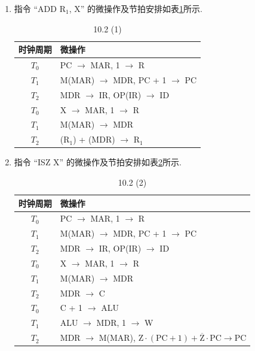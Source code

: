 \documentclass[UTF8]{report}
\newenvironment{solution}{{\noindent\hskip 2em \bf 解 \quad}}{}
\begin{document}
\begin{solution}
    \begin{enumerate}[label=(\arabic*)]
        \item 指令 ``ADD $\mathrm{R_1}$, X'' 的微操作及节拍安排如表\ref{tab:10_2_1}所示.
        \begin{table}[htbp]
            \centering
            \caption{10.2 (1)}
            \begin{tabular}{cl}
                \toprule
                时钟周期 & 微操作 \bigstrut\\
                \midrule
                $T_0$ & PC $\to$ MAR, 1 $\to$ R \bigstrut\\
                $T_1$ & M(MAR) $\to$ MDR, PC + 1 $\to$ PC \bigstrut\\
                $T_2$ & MDR $\to$ IR, OP(IR) $\to$ ID \bigstrut\\
                \midrule
                $T_0$ & X $\to$ MAR, 1 $\to$ R \bigstrut\\
                $T_1$ & M(MAR) $\to$ MDR \bigstrut\\
                $T_2$ & ($\mathrm{R_1}$) + (MDR) $\to$ $\mathrm{R_1}$ \bigstrut\\
                \bottomrule
            \end{tabular}
            \label{tab:10_2_1}%
        \end{table}

        \item 指令 ``ISZ X'' 的微操作及节拍安排如表\ref{tab:10_2_2}所示.
        \begin{table}[htbp]
            \centering
            \caption{10.2 (2)}
            \begin{tabular}{cl}
                \toprule
                时钟周期 & 微操作 \bigstrut\\
                \midrule
                $T_0$ & PC $\to$ MAR, 1 $\to$ R \bigstrut\\
                $T_1$ & M(MAR) $\to$ MDR, PC + 1 $\to$ PC \bigstrut\\
                $T_2$ & MDR $\to$ IR, OP(IR) $\to$ ID \bigstrut\\
                \midrule
                $T_0$ & X $\to$ MAR, 1 $\to$ R \bigstrut\\
                $T_1$ & M(MAR) $\to$ MDR \bigstrut\\
                $T_2$ & MDR $\to$ C \bigstrut\\
                \midrule
                $T_0$ & C + 1 $\to$ ALU \bigstrut\\
                $T_1$ & ALU $\to$ MDR, 1 $\to$ W \bigstrut\\
                $T_2$ & MDR $\to$ M(MAR), $\mathrm{Z} \cdot (\mathrm{PC} + 1) + \overline{\mathrm{Z}} \cdot \mathrm{PC} \to \mathrm{PC}$ \bigstrut\\
                \bottomrule
            \end{tabular}
            \label{tab:10_2_2}%
        \end{table}
    \end{enumerate}
\end{solution}
\end{document}
